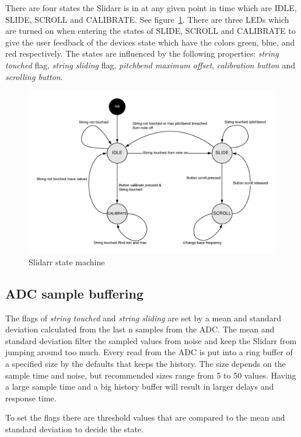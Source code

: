 \documentclass{article}
\begin{document}
There are four states the Slidarr is in at any given point in time which are IDLE, SLIDE, SCROLL and CALIBRATE. See figure~\ref{fig:slidarr state machine}. There are three LEDs which are turned on when entering the states of SLIDE, SCROLL and CALIBRATE to give the user feedback of the devices state which have the colors green, blue, and red respectively.
The states are influenced by the following properties: \textit{string touched} flag, \textit{string sliding} flag, \textit{pitchbend maximum offset}, \textit{calibration button} and \textit{scrolling button}.

\begin{figure}[ht]
  \centering
  \includegraphics[width=1\textwidth]{SlidarrStateMachine.png}
  \caption{Slidarr state machine}
  \label{fig:slidarr state machine}
\end{figure}

\subsection{ADC sample buffering}
The flags of \textit{string touched} and \textit{string sliding} are set by a mean and standard deviation calculated from the last n samples from the ADC. The mean and standard deviation filter the sampled values from noise and keep the Slidarr from jumping around too much.
Every read from the ADC is put into a ring buffer of a specified size by the defaults that keeps the history. The size depends on the sample time and noise, but recommended sizes range from 5 to 50 values. Having a large sample time and a big history buffer will result in larger delays and response time.

To set the flags there are threshold values that are compared to the mean and standard deviation to decide the state.
\end{document}
